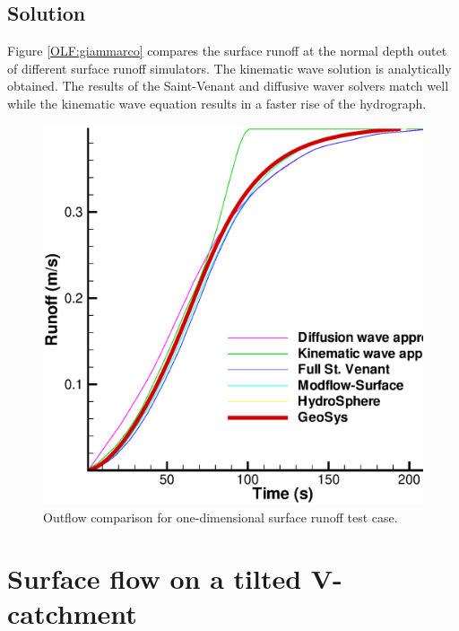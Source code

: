 \subsection{Solution}
%
Figure \ref{OLF:giammarco} compares the surface runoff at the normal depth outet of different surface runoff simulators. The kinematic wave solution is analytically obtained.
The results of the Saint-Venant and diffusive waver solvers match well while the kinematic wave equation results in a faster rise of the hydrograph. 
%
\begin{figure} [htb!]
 \centering
 \includegraphics[width=0.75\columnwidth] {PART_II/H_SFC/govin.eps}
 \caption{Outflow comparison for one-dimensional surface runoff test case.}
 \label{OLF:govin_outlet}
\end{figure}
%
%
%
\section{Surface flow on a tilted V-catchment}
\label{sec:Vcatch}
%
